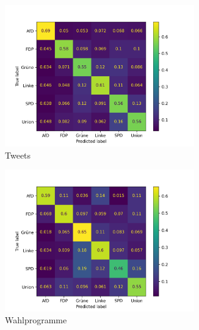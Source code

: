 \begin{figure}[H]
    \begin{subfigure}{0.5\textwidth}
        \centering
        \includegraphics[width=0.9\textwidth]{data/images/modeling/fasttext/none/tweets_confusion_matrix.png}
        \caption{Tweets} \label{sfig:confusionMatrixFastTextTweetsUnbalanced}
    \end{subfigure}
    \hfill
    \begin{subfigure}{0.5\textwidth}
        \centering
        \includegraphics[width=0.9\textwidth]{data/images/modeling/fasttext/none/party_programs_confusion_matrix.png}
        \caption{Wahlprogramme} \label{sfig:confusionMatrixFastTextManifestUnbalanced}
    \end{subfigure}
    \hfill
    \begin{subfigure}{0.5\textwidth}
        \centering

\end{subfigure}
\end{figure}
